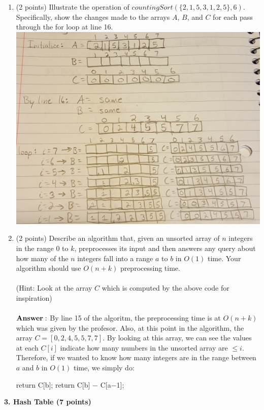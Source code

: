 \documentclass[12pt]{elsart}
\begin{document}
\begin{enumerate}
   \item (2 points) Illustrate the operation of $countingSort(\{2,1,5,3,1,2,5\},6)$.  Specifically, show the changes made to the arrays $A$, $B$, and $C$ for each pass through the for loop at line 16.\\
\includegraphics[scale=0.12]{countingSortArrays.jpg}
\newpage

   \item (2 points) Describe an algorithm that, given an unsorted array of $n$ integers in the range $0$ to $k$, preprocesses its
input and then answers any query about how many of the $n$ integers fall into a range $a$ to $b$ in $O(1)$ time. Your algorithm should use $O(n+k)$ preprocessing time.
\\\\(Hint: Look at the array $C$ which is computed by the above code for inspiration)\\\\
$\bf{Answer:}$ By line 15 of the algoritm, the preprocessing time is at $O(n+k)$ which was given by the profesor. Also, at this point in the algorithm, the array $C=[0,2,4,5,5,7,7]$. By looking at this array, we can see the values at each $C[i]$ indicate how many numbers in the unsorted array are $\leq i$. Therefore, if we wanted to know how many integers are in the range between $a$ and $b$ in $O(1)$ time, we simply do:
\begin{algorithmic}
	\State return C[b];
\Else
	\State return C[b] $-$ C[a$-$1];
\EndIf
\end{algorithmic}
\end{enumerate}
{\bf 3.  Hash Table (7 points)}
\end{document}
